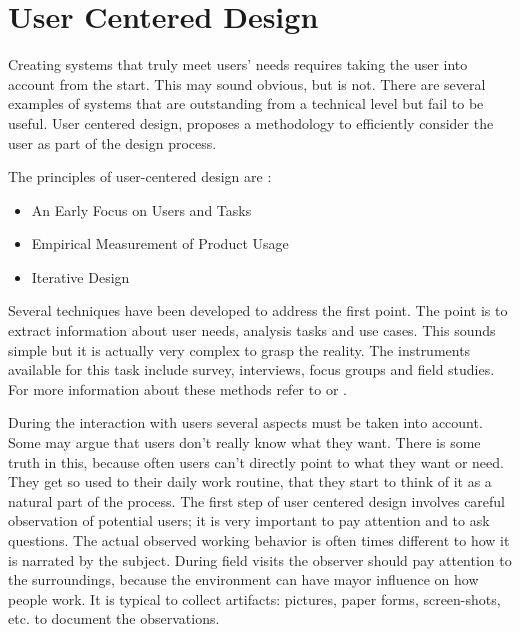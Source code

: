







\section{User Centered Design}

Creating systems that truly meet users' needs requires taking the user into account from the start. This may sound obvious, but is not. There are several examples of systems that are outstanding from a technical level but fail to be useful\autocite{norman_design_2002}. User centered design\autocite{baxter_understanding_2005}, proposes a methodology to efficiently consider the user as part of the design process. 

The principles of user-centered design are \autocite{baxter_understanding_2005}:

\begin{itemize}
	\item An Early Focus on Users and Tasks
	\item Empirical Measurement of Product Usage
	\item Iterative Design
\end{itemize}


Several techniques have been developed to address the first point. The point is to extract information about user needs, analysis tasks and use cases. This sounds simple but it is actually very complex to grasp the reality. The instruments available for this task include survey, interviews, focus groups and field studies. For more information about these methods refer to \autocite{baxter_understanding_2005} or \autocite{hartson_ux_2012}.

During the interaction with users several aspects must be taken into account. 
Some may argue that users don't really know what they want. There is some truth in this, because often users can't directly point to what they want or need. They get so used to their daily work routine, that they start to think of it as a natural part of the process. The first step of user centered design involves careful observation of potential users; it is very important to pay attention and to ask questions. The actual observed working behavior is often times different to how it is narrated by the subject. During field visits the observer should pay attention to the surroundings, because the environment can have mayor influence on how people work. It is typical to collect artifacts: pictures, paper forms, screen-shots, etc. to document the observations.

